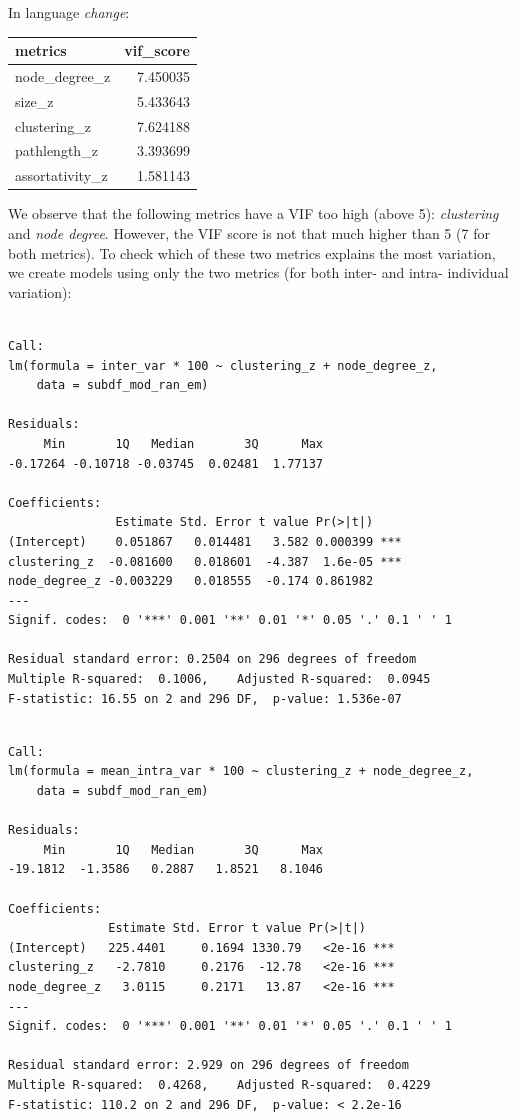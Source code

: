 \documentclass[
]{article}
\begin{document}
In language \emph{change}:

\begin{longtable}[]{@{}lr@{}}
\toprule()
metrics & vif\_score \\
\midrule()
\endhead
node\_degree\_z & 7.450035 \\
size\_z & 5.433643 \\
clustering\_z & 7.624188 \\
pathlength\_z & 3.393699 \\
assortativity\_z & 1.581143 \\
\bottomrule()
\end{longtable}

We observe that the following metrics have a VIF too high (above 5):
\emph{clustering} and \emph{node degree}. However, the VIF score is not
that much higher than 5 (7 for both metrics). To check which of these
two metrics explains the most variation, we create models using only the
two metrics (for both inter- and intra- individual variation):

\begin{verbatim}

Call:
lm(formula = inter_var * 100 ~ clustering_z + node_degree_z, 
    data = subdf_mod_ran_em)

Residuals:
     Min       1Q   Median       3Q      Max 
-0.17264 -0.10718 -0.03745  0.02481  1.77137 

Coefficients:
               Estimate Std. Error t value Pr(>|t|)    
(Intercept)    0.051867   0.014481   3.582 0.000399 ***
clustering_z  -0.081600   0.018601  -4.387  1.6e-05 ***
node_degree_z -0.003229   0.018555  -0.174 0.861982    
---
Signif. codes:  0 '***' 0.001 '**' 0.01 '*' 0.05 '.' 0.1 ' ' 1

Residual standard error: 0.2504 on 296 degrees of freedom
Multiple R-squared:  0.1006,    Adjusted R-squared:  0.0945 
F-statistic: 16.55 on 2 and 296 DF,  p-value: 1.536e-07
\end{verbatim}

\begin{verbatim}

Call:
lm(formula = mean_intra_var * 100 ~ clustering_z + node_degree_z, 
    data = subdf_mod_ran_em)

Residuals:
     Min       1Q   Median       3Q      Max 
-19.1812  -1.3586   0.2887   1.8521   8.1046 

Coefficients:
              Estimate Std. Error t value Pr(>|t|)    
(Intercept)   225.4401     0.1694 1330.79   <2e-16 ***
clustering_z   -2.7810     0.2176  -12.78   <2e-16 ***
node_degree_z   3.0115     0.2171   13.87   <2e-16 ***
---
Signif. codes:  0 '***' 0.001 '**' 0.01 '*' 0.05 '.' 0.1 ' ' 1

Residual standard error: 2.929 on 296 degrees of freedom
Multiple R-squared:  0.4268,    Adjusted R-squared:  0.4229 
F-statistic: 110.2 on 2 and 296 DF,  p-value: < 2.2e-16
\end{verbatim}
\end{document}

